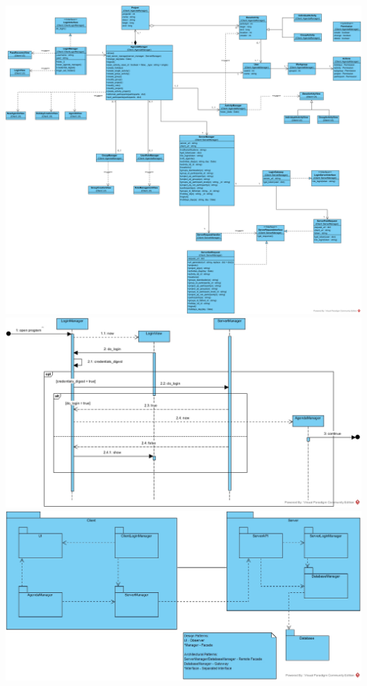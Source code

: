 \documentclass[12pt]{scrartcl}
\begin{document}
\includegraphics[scale=0.4]{ManageIT_Client_ImplementedClassDiagram.png}\\
\includegraphics[angle=90,origin=c,scale=0.6]{ManageIT_LoginSequenceClasses.jpg}\\
\includegraphics[angle=90,origin=c,scale=0.6]{ManageIT_PackageDiagram.jpg}\\
\end{document}
